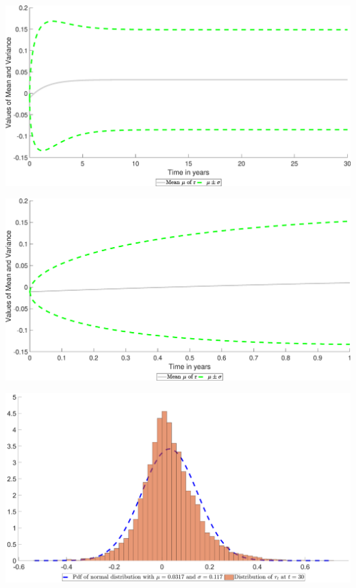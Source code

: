 \begin{landscape}
\includegraphics[width=.95\columnwidth]{MeanVar/MV_A_1}
\end{landscape}
\begin{landscape}
\includegraphics[width=.95\columnwidth]{MeanVar/MV_A_2}
\end{landscape}
\begin{landscape}
\includegraphics[width=.95\columnwidth]{MeanVar/MV_A_3}
\end{landscape}
